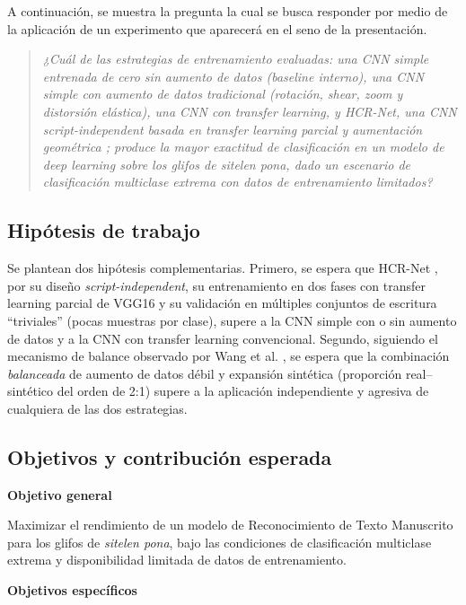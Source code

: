 \documentclass[conference]{IEEEtran}
\begin{document}
A continuación, se muestra la pregunta la cual se busca responder por medio de la aplicación de un experimento que aparecerá en el seno de la presentación.

\begin{quote}
\emph{¿Cuál de las estrategias de entrenamiento evaluadas: una CNN simple
entrenada de cero sin aumento de datos (baseline interno), una CNN simple
con aumento de datos tradicional (rotación, shear, zoom y distorsión
elástica), una CNN con transfer learning, y HCR-Net, una CNN
\textit{script-independent} basada en transfer learning parcial y
aumentación geométrica \cite{hcrnet_2024}; produce la mayor exactitud de
clasificación en un modelo de \textit{deep learning} sobre los glifos de
\textit{sitelen pona}, dado un escenario de clasificación multiclase
extrema con datos de entrenamiento limitados?}
\end{quote}

\subsection{Hipótesis de trabajo}
Se plantean dos hipótesis complementarias. Primero, se espera que HCR-Net \cite{hcrnet_2024}, por su diseño \textit{script-independent}, su entrenamiento en dos fases con transfer learning parcial de VGG16 y su validación en múltiples conjuntos de escritura ``triviales'' (pocas muestras por clase), supere a la CNN simple con o sin aumento de datos y a la CNN con transfer learning convencional. Segundo, siguiendo el mecanismo de balance observado por Wang et al. \cite{wang_smartexp_2025}, se espera que la combinación \emph{balanceada} de aumento de datos débil y expansión sintética (proporción real--sintético del orden de 2:1) supere a la aplicación independiente y agresiva de cualquiera de las dos estrategias.

\subsection{Objetivos y contribución esperada}


\textbf{Objetivo general}

Maximizar el rendimiento de un modelo de Reconocimiento de Texto Manuscrito
para los glifos de \textit{sitelen pona}, bajo las condiciones de
clasificación multiclase extrema y disponibilidad limitada de datos de
entrenamiento.

\textbf{Objetivos específicos}
\end{document}
